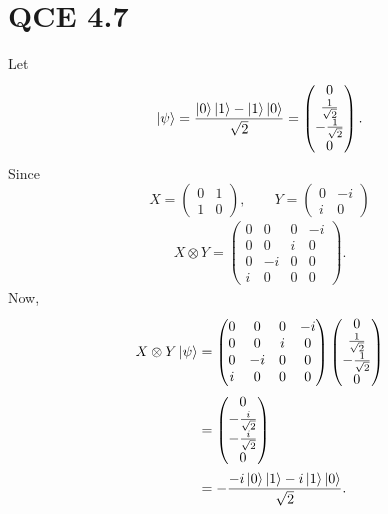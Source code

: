 \documentclass[10pt]{article}
\begin{document}
\section*{QCE 4.7}
 Let 
 \[
 \ket{\psi} = \frac{ \ket{ 0 } \ket{ 1 } - \ket{ 1 } \ket{ 0 } }{ \sqrt{ 2 } } =
 \begin{pmatrix}
 0 \\
 \frac{1}{\sqrt{2}} \\
 -\frac{1}{\sqrt{2}} \\
 0
 \end{pmatrix}.
 \]
 Since
 \[
 X = \begin{pmatrix}
 0 & 1 \\
 1 & 0
 \end{pmatrix}, \qquad
 Y = \begin{pmatrix}
 0 & -i \\
 i & 0
 \end{pmatrix}
 \]
\begin{align*}
X \otimes Y = 
\begin{pmatrix}
0 & 0 & 0 & -i \\
0 & 0 & i & 0 \\
0 & -i & 0 & 0 \\
i & 0 & 0 & 0
\end{pmatrix}.
\end{align*}
Now,
\begin{align*}
X \otimes Y \ket{\psi} &= 
\begin{pmatrix}
0 & 0 & 0 & -i \\
0 & 0 & i & 0 \\
0 & -i & 0 & 0 \\
i & 0 & 0 & 0
\end{pmatrix}
\begin{pmatrix}
0 \\
\frac{1}{\sqrt{2}} \\
- \frac{1}{\sqrt{2}} \\
0
\end{pmatrix} \\
   &= 
   \begin{pmatrix}
   0 \\
   -\frac{i}{\sqrt{2}} \\
   -\frac{i}{\sqrt{2}} \\
   0
   \end{pmatrix} \\
   &= -\frac{-i\ket{0} \ket{1} - i \ket{1} \ket{0}}{\sqrt{2}}.
\end{align*}
\end{document}
